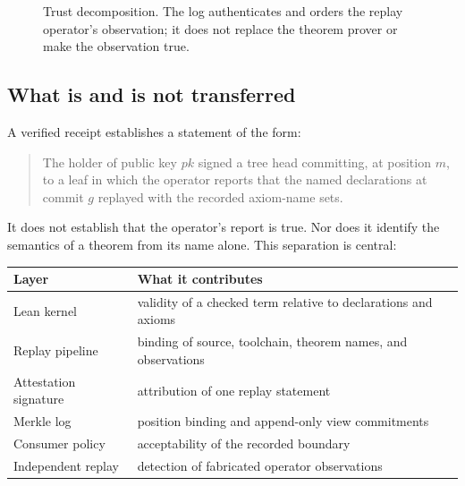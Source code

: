 \documentclass[11pt]{article}
\theoremstyle{remark}
\begin{document}
\begin{figure}[t]
\centering
{}
\caption{Trust decomposition. The log authenticates and orders the replay
operator's observation; it does not replace the theorem prover or make the
observation true.}
\label{fig:decomposition}
\end{figure}

\subsection{What is and is not transferred}

A verified receipt establishes a statement of the form:
\begin{quote}
The holder of public key $pk$ signed a tree head committing, at position $m$,
to a leaf in which the operator reports that the named declarations at commit
$g$ replayed with the recorded axiom-name sets.
\end{quote}
It does not establish that the operator's report is true. Nor does it identify
the semantics of a theorem from its name alone. This separation is central:

\begin{center}\small
\begin{tabular}{@{}ll@{}}
\toprule
Layer & What it contributes \\
\midrule
Lean kernel & validity of a checked term relative to declarations and axioms \\
Replay pipeline & binding of source, toolchain, theorem names, and observations \\
Attestation signature & attribution of one replay statement \\
Merkle log & position binding and append-only view commitments \\
Consumer policy & acceptability of the recorded boundary \\
Independent replay & detection of fabricated operator observations \\
\bottomrule
\end{tabular}
\end{center}
\end{document}
